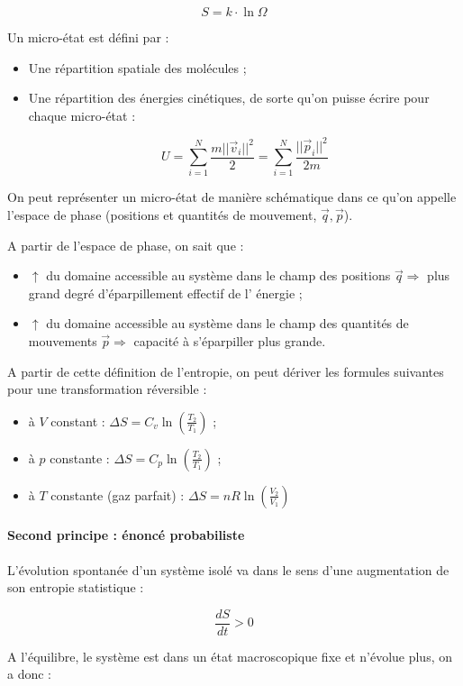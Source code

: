 $$S = k \cdot \ln \Omega$$

Un micro-état est défini par :
\begin{itemize}
	\item Une répartition spatiale des molécules ;
	\item	Une répartition des énergies cinétiques, de sorte
	qu'on puisse écrire pour chaque micro-état :
	
	$$U = \sum_{i=1}^N \frac{m ||\vec{v}_i||^2}{2} = 
	\sum_{i=1}^N \frac{||\vec{p}_i||^2}{2m}$$
\end{itemize}

On peut représenter un micro-état de manière schématique
dans ce qu'on appelle l'espace de phase (positions
et quantités de mouvement, ${\vec{q}, \vec{p}}$).

A partir de l'espace de phase, on sait que :

\begin{itemize}
	\item $\uparrow$ du domaine accessible au système
	dans le champ des positions $\vec{q} \Rightarrow$
	plus grand degré d'éparpillement effectif de l'
	énergie ;
	\item $\uparrow$ du domaine accessible au système
	dans le champ des quantités de mouvements $\vec{p}
	\Rightarrow$ capacité à s'éparpiller plus grande.
\end{itemize}

A partir de cette définition de l'entropie, on peut
dériver les formules suivantes pour une transformation
réversible :

\begin{itemize}
	\item à $V$ constant : $\Delta S = C_v \ln (\frac{T_2}{T_1})$ ;
	\item à $p$ constante : $\Delta S = C_p \ln (\frac{T_2}{T_1})$ ;
	\item à $T$ constante (gaz parfait) : $\Delta S = nR \ln (\frac{V_2}{V_1})$
\end{itemize}

\paragraph{Second principe : énoncé probabiliste}
L'évolution spontanée d'un système isolé va dans le
sens d'une augmentation de son entropie statistique :

$$\frac{dS}{dt} > 0$$

A l'équilibre, le système est dans un état macroscopique
fixe et n'évolue plus, on a donc :

